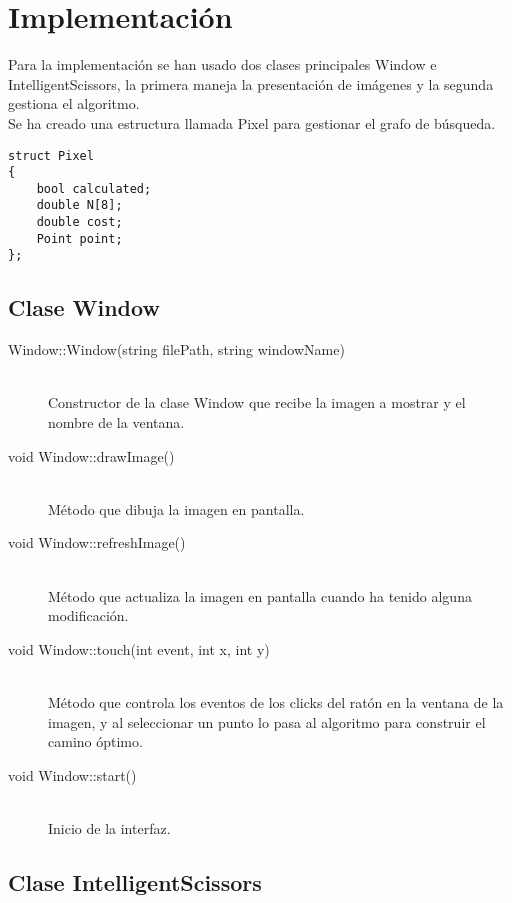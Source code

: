 \section{Implementación}

Para la implementación se han usado dos clases principales Window e IntelligentScissors, la primera maneja la presentación de imágenes y la segunda gestiona el algoritmo. \\

Se ha creado una estructura llamada Pixel para gestionar el grafo de búsqueda.
\\

\begin{lstlisting}
struct Pixel
{
	bool calculated;
	double N[8];
	double cost;
	Point point;
};
\end{lstlisting}

\subsection{Clase Window}

\begin{description}
\item[Window::Window(string filePath, string windowName)] \hfill \\
	Constructor de la clase Window que recibe la imagen a mostrar y el nombre de la ventana.
\item[void Window::drawImage()]\hfill \\
	Método que dibuja la imagen en pantalla.
\item[void Window::refreshImage()] \hfill \\
	Método que actualiza la imagen en pantalla cuando ha tenido alguna modificación.
\item[void Window::touch(int event, int x, int y)]\hfill \\
	Método que controla los eventos de los clicks del ratón en la ventana de la imagen, y al seleccionar un punto lo pasa al algoritmo para construir el camino óptimo.
\item[void Window::start()]\hfill \\
	Inicio de la interfaz.

\end{description}

\subsection{Clase IntelligentScissors}

